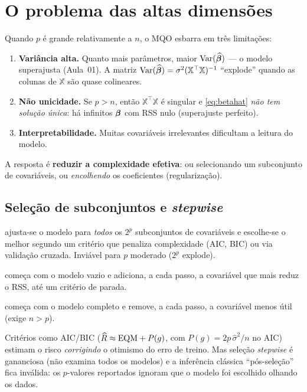 \documentclass[11pt,a4paper]{article}
\begin{document}
\section{O problema das altas dimensões}
Quando $p$ é grande relativamente a $n$, o MQO esbarra em três limitações:
\begin{enumerate}[leftmargin=1.6cm]
  \item \textbf{Variância alta.} Quanto mais parâmetros, maior $\operatorname{Var}(\widehat{\bm{\beta}})$
        --- o modelo superajusta (Aula~01). A matriz $\operatorname{Var}(\widehat{\bm{\beta}})
        =\sigma^2(\mathbb{X}^\top\mathbb{X})^{-1}$ ``explode'' quando as colunas de
        $\mathbb{X}$ são quase colineares.
  \item \textbf{Não unicidade.} Se $p>n$, então $\mathbb{X}^\top\mathbb{X}$ é singular e
        \eqref{eq:betahat} \emph{não tem solução única}: há infinitos $\bm{\beta}$ com
        RSS nulo (superajuste perfeito).
  \item \textbf{Interpretabilidade.} Muitas covariáveis irrelevantes dificultam a
        leitura do modelo.
\end{enumerate}
A resposta é \textbf{reduzir a complexidade efetiva}: ou selecionando um
subconjunto de covariáveis, ou \emph{encolhendo} os coeficientes (regularização).

\subsection{Seleção de subconjuntos e \emph{stepwise}}
\begin{description}[leftmargin=2.4cm,style=nextline]
  \item[Melhor subconjunto] ajusta-se o modelo para \emph{todos} os $2^p$
        subconjuntos de covariáveis e escolhe-se o melhor segundo um critério que
        penaliza complexidade (AIC, BIC) ou via validação cruzada. Inviável para
        $p$ moderado ($2^p$ explode).
  \item[\emph{Forward stepwise}] começa com o modelo vazio e adiciona, a cada
        passo, a covariável que mais reduz o RSS, até um critério de parada.
  \item[\emph{Backward stepwise}] começa com o modelo completo e remove, a cada
        passo, a covariável menos útil (exige $n>p$).
\end{description}

\begin{atencao}
Critérios como AIC/BIC ($\widehat{R} \approx \mathrm{EQM} + P(g)$, com
$P(g)=2p\,\widehat\sigma^2/n$ no AIC) estimam o risco \emph{corrigindo} o otimismo do
erro de treino. Mas seleção \emph{stepwise} é gananciosa (não examina todos os
modelos) e a inferência clássica ``pós-seleção'' fica inválida: os $p$-valores
reportados ignoram que o modelo foi escolhido olhando os dados.
\end{atencao}
\end{document}
